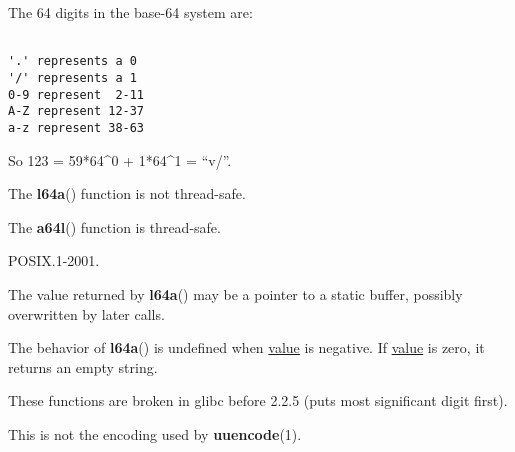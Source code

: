 \documentclass[]{article}
\let\realtextbf=\textbf
\renewcommand{\textbf}[1]{\textcolor{boldcolor}{\realtextbf{#1}}}
\renewcommand{\emph}[1]{\underline{#1}}
\begin{document}
The 64 digits in the base-64 system are:

\begin{verbatim}

'.' represents a 0
'/' represents a 1
0-9 represent  2-11
A-Z represent 12-37
a-z represent 38-63
\end{verbatim}

So 123 = 59*64\^{}0 + 1*64\^{}1 = ``v/''.



The \textbf{l64a}() function is not thread-safe.

The \textbf{a64l}() function is thread-safe.


POSIX.1-2001.


The value returned by \textbf{l64a}() may be a pointer to a static
buffer, possibly overwritten by later calls.

The behavior of \textbf{l64a}() is undefined when \emph{value} is
negative. If \emph{value} is zero, it returns an empty string.

These functions are broken in glibc before 2.2.5 (puts most significant
digit first).

This is not the encoding used by \textbf{uuencode}(1).

\end{document}
